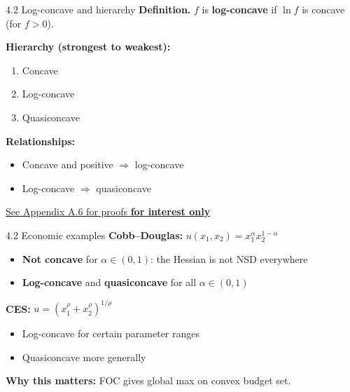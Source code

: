 \documentclass[11pt,aspectratio=169]{beamer}
\newcommand{\InterestOnly}{\textcolor{mAccent}{\textbf{for interest only}}}
\begin{document}
\begin{frame}{4.2 Log-concave and hierarchy}
  \small
  \textbf{Definition.} $f$ is \textbf{log-concave} if $\ln f$ is concave (for $f > 0$).
  
  \textbf{Hierarchy (strongest to weakest):}
  
  \begin{enumerate}
    \item Concave
    
    \item Log-concave
    
    \item Quasiconcave
  \end{enumerate}
  
  \textbf{Relationships:}
  
  \begin{itemize}
    \item Concave and positive $\Rightarrow$ log-concave
    
    \item Log-concave $\Rightarrow$ quasiconcave
  \end{itemize}
  
  \hfill\hyperlink{appendix:logconcave}{\scriptsize See Appendix A.6 for proofs \InterestOnly}
\end{frame}

\begin{frame}{4.2 Economic examples}
  \small
  \textbf{Cobb--Douglas:} $u(x_1, x_2) = x_1^\alpha x_2^{1-\alpha}$
  
  \begin{itemize}
    \item \textbf{Not concave} for $\alpha \in (0,1)$: the Hessian is not NSD everywhere
    
    \item \textbf{Log-concave} and \textbf{quasiconcave} for all $\alpha \in (0,1)$
  \end{itemize}
  
  \textbf{CES:} $u = (x_1^\rho + x_2^\rho)^{1/\rho}$
  
  \begin{itemize}
    \item Log-concave for certain parameter ranges
    
    \item Quasiconcave more generally
  \end{itemize}
  
  \textbf{Why this matters:} FOC gives global max on convex budget set.
\end{frame}
\end{document}
